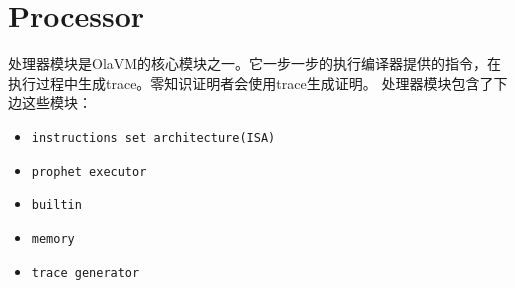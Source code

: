 \section{Processor}\label{sec: processor}
处理器模块是OlaVM的核心模块之一。它一步一步的执行编译器提供的指令，在执行过程中生成trace。零知识证明者会使用trace生成证明。
处理器模块包含了下边这些模块：
\begin{itemize}
    \item \verb|instructions set architecture(ISA)|
    \item \verb|prophet executor|
    \item \verb|builtin|
    \item \verb|memory|
    \item \verb|trace generator|
\end{itemize}






